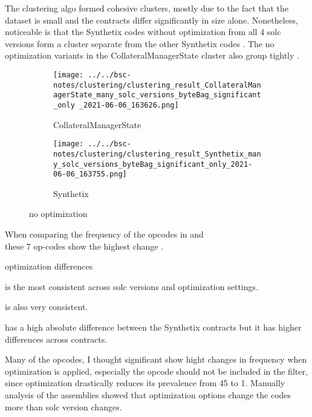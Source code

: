 \documentclass[../main.tex]{subfiles}
\begin{document}
The clustering algo formed cohesive clusters, mostly due to the fact that the dataset is small and the contracts differ significantly in size alone.
Nonetheless, noticeable is that the Synthetix codes without optimization from all 4 solc versions form a cluster separate from the other Synthetix codes . The no optimization variants in the CollateralManagerState cluster also group tightly .

\begin{figure}[ht!]
  \begin{subfigure}[b]{0.5 \linewidth}
    \texttt{[image: ../../bsc-notes/clustering/clustering\_result\_CollateralManagerState\_many\_solc\_versions\_byteBag\_significant\_only \_2021-06-06\_163626.png]}%
    \caption{CollateralManagerState}
    \label{fig:CollateralManagerState}
  \end{subfigure}%
  \begin{subfigure}[b]{0.5 \linewidth}
    \texttt{[image: ../../bsc-notes/clustering/clustering\_result\_Synthetix\_many\_solc\_versions\_byteBag\_significant\_only\_2021-06-06\_163755.png]}
    \caption{Synthetix}
    \label{fig:Synthetix}
  \end{subfigure}
  \caption{no optimization}
\end{figure}

When comparing the frequency of the opcodes in  and\\
 these 7 op-codes show the highest change .

\begin{table}[ht!]
  \centering
  \caption{optimization differences}
  \label{tbl:opt_diff}
\end{table}

 is the most consistent across solc versions and optimization settings.

 is also very consistent.

 has a high absolute difference between the Synthetix contracts but it has higher differences across contracts.

Many of the opcodes, I thought significant show hight changes in frequency when optimization is applied, especially the  opcode should not be included in the filter, since optimization drastically reduces its prevalence from 45 to 1.
Manually analysis of the assemblies showed that optimization options change the codes more than solc version changes.
\end{document}

